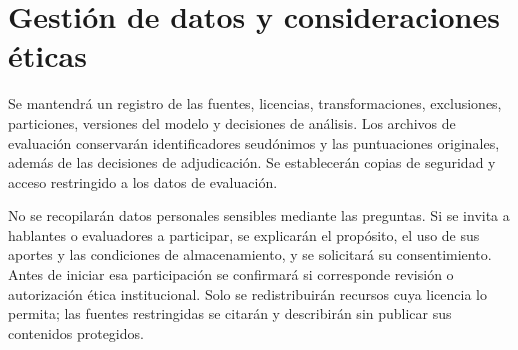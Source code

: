 \section{Gestión de datos y consideraciones éticas}\label{gestiuxf3n-de-datos-y-consideraciones-uxe9ticas}

Se mantendrá un registro de las fuentes, licencias, transformaciones, exclusiones, particiones, versiones del modelo y decisiones de análisis. Los archivos de evaluación conservarán identificadores seudónimos y las puntuaciones originales, además de las decisiones de adjudicación. Se establecerán copias de seguridad y acceso restringido a los datos de evaluación.

No se recopilarán datos personales sensibles mediante las preguntas. Si se invita a hablantes o evaluadores a participar, se explicarán el propósito, el uso de sus aportes y las condiciones de almacenamiento, y se solicitará su consentimiento. Antes de iniciar esa participación se confirmará si corresponde revisión o autorización ética institucional. Solo se redistribuirán recursos cuya licencia lo permita; las fuentes restringidas se citarán y describirán sin publicar sus contenidos protegidos.
